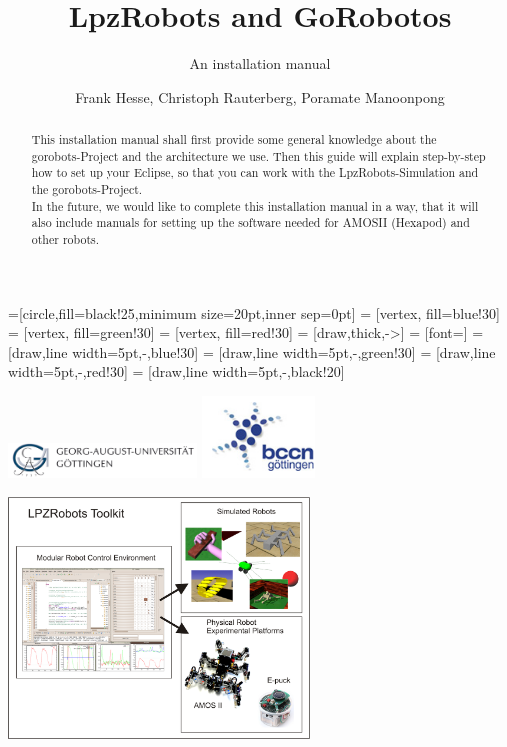 \documentclass[a4paper,10pt]{scrartcl}
\title{LpzRobots and GoRobotos}
\subtitle{An installation manual}
\author{Frank Hesse, Christoph Rauterberg, Poramate Manoonpong}
\begin{document}
 =[circle,fill=black!25,minimum size=20pt,inner sep=0pt]
  = [vertex, fill=blue!30]
  = [vertex, fill=green!30]
  = [vertex, fill=red!30]
  = [draw,thick,->]
  = [font=\small]
  = [draw,line width=5pt,-,blue!30]
  = [draw,line width=5pt,-,green!30]
  = [draw,line width=5pt,-,red!30]
  = [draw,line width=5pt,-,black!20]
\renewcommand{\emph}[1]{\textcolor{blue}{#1}}
\newcommand{\remph}[1]{\textcolor{red}{#1}}


\maketitle

\begin{center}
\includegraphics[width=5cm]{./pics/LogoUni.png} %
 \includegraphics[width=3cm]{./pics/LogoBCCN.png}\\ %
\end{center}

\begin{abstract}
This installation manual shall first provide some general knowledge about the gorobots-Project and
the architecture we use. Then this guide will explain step-by-step how to set up
your Eclipse, so that you can work with the LpzRobots-Simulation and the gorobots-Project. \\
In the future, we would like to complete this installation manual in a way, that it will also include manuals for setting up the software needed for AMOSII (Hexapod) and other robots.
\end{abstract}

\begin{center}
\includegraphics[width=8cm]{./pics/AIdiagram.png}
\end{center}
\end{document}
